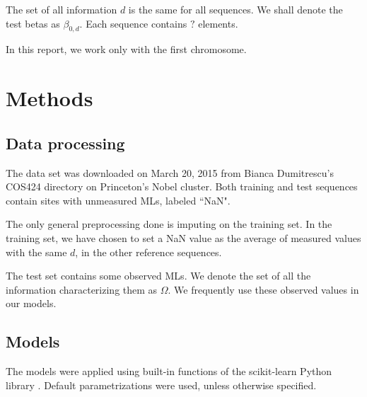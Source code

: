 \documentclass{article} %
\begin{document}
The set of all information $d$ is the same for all sequences. We shall denote the test betas as $\beta_{0,d}$. Each sequence contains $?$ elements. 

In this report, we work only with the first chromosome.

\section{Methods}

\subsection{Data processing}

The data set was downloaded on March 20, 2015 from Bianca Dumitrescu's COS424 directory on Princeton's Nobel cluster. Both training and test sequences contain sites with unmeasured MLs, labeled ``NaN".

The only general preprocessing done is imputing on the training set. In the training set, we have chosen to set a NaN value as the average of measured values with the same $d$, in the other reference sequences. 

The test set contains some observed MLs. We denote the set of all the information characterizing them as $\Omega$. We frequently use these observed values in our models.

\subsection{Models}

The models were applied using built-in functions of the scikit-learn Python library \cite{scikit-learn}. Default parametrizations were used, unless otherwise specified.
\end{document}
